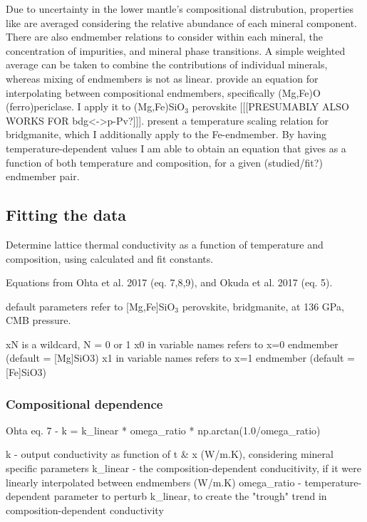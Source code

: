 Due to uncertainty in the lower mantle's compositional distrubution, properties like \tcs are averaged considering the relative abundance of each mineral component. There are also endmember relations to consider within each mineral, the concentration of impurities, and mineral phase transitions.  A simple weighted average can be taken to combine the contributions of individual minerals, whereas mixing of endmembers is not as linear. \cite{Ohta2017} provide an equation for interpolating \cs between compositional endmembers, specifically (Mg,Fe)O (ferro)periclase. I apply it to (Mg,Fe)SiO$_3$ perovskite [[[PRESUMABLY ALSO WORKS FOR bdg<->p-Pv?]]]. \cite{Okuda2017} present a temperature scaling relation for bridgmanite, which I additionally apply to the Fe-endmember. By having temperature-dependent values I am able to obtain an equation that gives \tcs as a function of both temperature and composition, for a given (studied/fit?) endmember pair.


\subsection{Fitting the data}

Determine lattice thermal conductivity as a function of temperature and composition, 
using calculated and fit constants.
    
Equations from Ohta et al. 2017 (eq. 7,8,9), and Okuda et al. 2017 (eq. 5).

default parameters refer to [Mg,Fe]SiO$_3$ perovskite, bridgmanite, at 136 GPa, CMB pressure.

xN is a wildcard, N = 0 or 1
x0 in variable names refers to x=0 endmember (default = [Mg]SiO3)
x1 in variable names refers to x=1 endmember (default = [Fe]SiO3)


\subsubsection{Compositional dependence}
\cite{Ohta2017}

    Ohta eq. 7 - k = k\_linear * omega\_ratio * np.arctan(1.0/omega\_ratio) 
                  
                 k           - output conductivity as function of t \& x (W/m.K), 
                               considering mineral specific parameters
                 k\_linear    - the composition-dependent conducitivity,
                               if it were linearly interpolated between endmembers (W/m.K)
                 omega\_ratio - temperature-dependent parameter to perturb k\_linear,
                               to create the "trough" trend in composition-dependent conductivity


